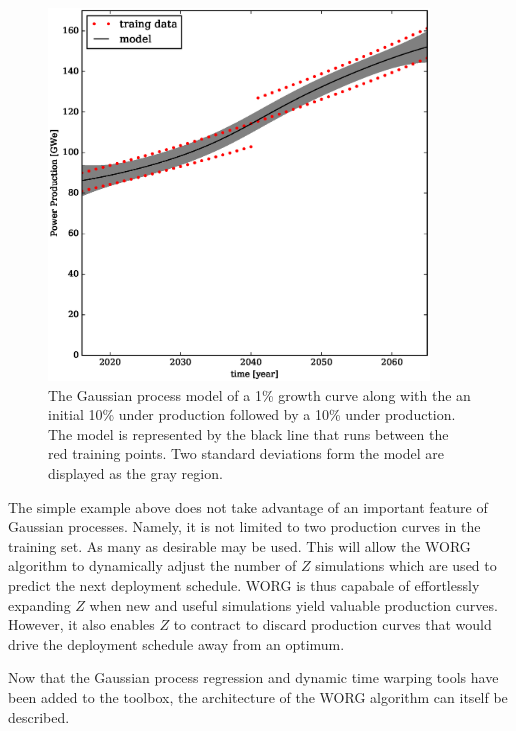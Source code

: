 \begin{figure}[htb]
\centering
\includegraphics[width=0.9\textwidth]{gwe-model-.eps}
\caption{The Gaussian process model of a 1\% growth curve along with the
an initial 10\% under production followed by a 10\% under production. 
The model is represented by the black line that runs between the red 
training points. Two standard deviations form the model are displayed as the
gray region.}
\label{gwe-model-}
\end{figure}

The simple example above does not take advantage of an important 
feature of Gaussian processes. Namely, it is not limited to two production
curves in the training set.  As many as desirable may be used.  This will
allow the WORG algorithm to dynamically adjust the number of $Z$ simulations 
which are used to predict the next deployment schedule. WORG is thus capabale
of 
effortlessly expanding $Z$ when new and useful simulations yield valuable production
curves.  However, it also enables $Z$ to contract to discard production
curves that would drive the deployment schedule away from an optimum.

Now that the Gaussian process regression and dynamic time warping tools have 
been added to the toolbox, the architecture of the WORG algorithm can 
itself be described.

\clearpage
